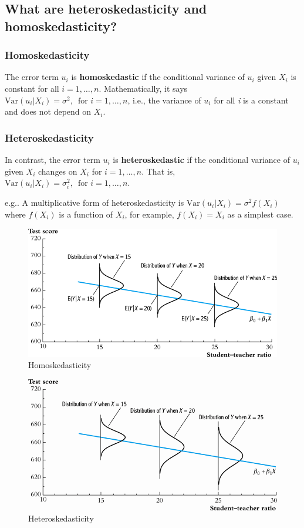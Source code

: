 \documentclass[a4paper,11pt]{article}
\newcommand{\var}{\mathrm{Var}}
\begin{document}
\subsection{What are heteroskedasticity and homoskedasticity?}
\label{sec:org39fb28f}

\subsubsection*{Homoskedasticity}
\label{sec:orgfa0938b}

The error term \(u_i\) is \textbf{homoskedastic} if the conditional variance of
\(u_i\) given \(X_i\) is constant for all \(i = 1, \ldots, n\). Mathematically,
it says \(\var(u_i | X_i) = \sigma^2,\, \text{ for } i = 1, \ldots, n\),
i.e., the variance of \(u_i\) for all \emph{i} is a constant and does not
depend on \(X_i\).

\subsubsection*{Heteroskedasticity}
\label{sec:org976e70a}
In contrast, the error term \(u_i\) is \textbf{heteroskedastic} if the conditional variance of
\(u_i\) given \(X_i\) changes on \(X_i\) for \(i = 1, \ldots, n\). That is,
\(\var(u_i | X_i) = \sigma^2_i,\, \text{ for } i = 1, \ldots, n\).

e.g.. A multiplicative form of heteroskedasticity is \(\var(u_i|X_i)
= \sigma^2 f(X_i)\) where \(f(X_i)\) is a function of \(X_i\), for
example, \(f(X_i) = X_i\) as a simplest case.

\begin{figure}[htbp]
\centering
\includegraphics[width=.9\linewidth]{figure/fig-4-4.png}
\caption{Homoskedasticity}
\end{figure} 

\begin{figure}[htbp]
\centering
\includegraphics[width=.9\linewidth]{figure/fig-5-2.png}
\caption{Heteroskedasticity}
\end{figure}
\end{document}

